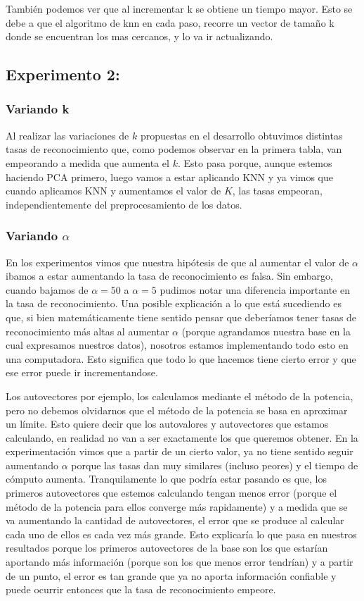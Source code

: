 También podemos ver que al incrementar k se obtiene un tiempo mayor. Esto se debe a que el algoritmo de knn en cada paso, recorre un vector de tamaño k donde se encuentran los mas cercanos, y lo va ir actualizando. 



 \subsection{Experimento 2:}
\subsubsection{Variando k}
Al realizar las variaciones de $k$ propuestas en el desarrollo obtuvimos distintas tasas de reconocimiento que, como podemos observar en la primera tabla, van empeorando a medida que aumenta el $k$. Esto pasa porque, aunque estemos haciendo PCA primero, luego vamos a estar aplicando KNN y ya vimos que cuando aplicamos KNN y aumentamos el valor de $K$, las tasas empeoran, independientemente del preprocesamiento de los datos.
\subsubsection{Variando $\alpha$}
En los experimentos vimos que nuestra hipótesis de que al aumentar el valor de $\alpha$ ibamos a estar aumentando la tasa de reconocimiento es falsa. Sin embargo, cuando bajamos de $\alpha = 50$ a $\alpha = 5$ pudimos notar una diferencia importante en la tasa de reconocimiento. Una posible explicación a lo que está sucediendo es que, si bien matemáticamente tiene sentido pensar que deberíamos tener tasas de reconocimiento más altas al aumentar $\alpha$ (porque agrandamos nuestra base en la cual expresamos nuestros datos), nosotros estamos implementando todo esto en una computadora. Esto significa que todo lo que hacemos tiene cierto error y que ese error puede ir incrementandose. 
\par Los autovectores por ejemplo, los calculamos mediante el método de la potencia, pero no debemos olvidarnos que el método de la potencia se basa en aproximar un límite. Esto quiere decir que los autovalores y autovectores que estamos calculando, en realidad no van a ser exactamente los que queremos obtener. En la experimentación vimos que a partir de un cierto valor, ya no tiene sentido seguir aumentando $\alpha$ porque las tasas dan muy similares (incluso peores) y el tiempo de cómputo aumenta. Tranquilamente lo que podría estar pasando es que, los primeros autovectores que estemos calculando tengan menos error (porque el método de la potencia para ellos converge más rapidamente) y a medida que se va aumentando la cantidad de autovectores, el error que se produce al calcular cada uno de ellos es cada vez más grande. Esto explicaría lo que pasa en nuestros resultados porque los primeros autovectores de la base son los que estarían aportando más información (porque son los que menos error tendrían) y a partir de un punto, el error es tan grande que ya no aporta información confiable y puede ocurrir entonces que la tasa de reconocimiento empeore.



